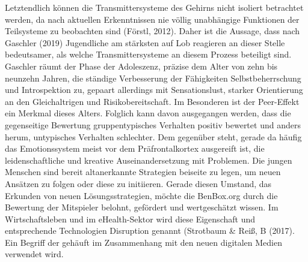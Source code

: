 \documentclass[
  a4paper,
  DIV=11,
  numbers=noendperiod,
  onecolumn,
  oneside,
  a4paper]{scrartcl}
\begin{document}
Letztendlich können die Transmittersysteme des Gehirns nicht isoliert
betrachtet werden, da nach aktuellen Erkenntnissen nie völlig
unabhängige Funktionen der Teilsysteme zu beobachten sind (Förstl,
2012). Daher ist die Aussage, dass nach Gaschler (2019) Jugendliche am
stärksten auf Lob reagieren an dieser Stelle bedeutsamer, als welche
Transmittersysteme an diesem Prozess beteiligt sind. Gaschler räumt der
Phase der Adoleszenz, präzise dem Alter von zehn bis neunzehn Jahren,
die ständige Verbesserung der Fähigkeiten Selbstbeherrschung und
Introspektion zu, gepaart allerdings mit Sensationslust, starker
Orientierung an den Gleichaltrigen und Risikobereitschaft. Im Besonderen
ist der Peer-Effekt ein Merkmal dieses Alters. Folglich kann davon
ausgegangen werden, dass die gegenseitige Bewertung gruppentypisches
Verhalten positiv bewertet und anders herum, untypisches Verhalten
schlechter. Dem gegenüber steht, gerade da häufig das Emotionssystem
meist vor dem Präfrontalkortex ausgereift ist, die leidenschaftliche und
kreative Auseinandersetzung mit Problemen. Die jungen Menschen sind
bereit altanerkannte Strategien beiseite zu legen, um neuen Ansätzen zu
folgen oder diese zu initiieren. Gerade diesen Umstand, das Erkunden von
neuen Lösungsstrategien, möchte die BenBox.org durch die Bewertung der
Mitspieler belohnt, gefördert und wertgeschätzt wissen. Im
Wirtschaftsleben und im eHealth-Sektor wird diese Eigenschaft und
entsprechende Technologien Disruption genannt (Strotbaum \& Reiß, B
(2017). Ein Begriff der gehäuft im Zusammenhang mit den neuen digitalen
Medien verwendet wird.
\end{document}
